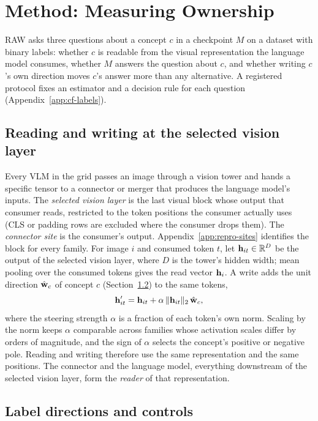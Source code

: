 \section{Method: Measuring Ownership}
\label{sec:framework}

RAW asks three questions about a concept $c$ in a checkpoint $M$ on a dataset with binary labels: whether $c$ is readable from the visual representation the language model consumes, whether $M$ answers the question about $c$, and whether writing $c$'s own direction moves $c$'s answer more than any alternative. A registered protocol fixes an estimator and a decision rule for each question (Appendix~\ref{app:cf-labels}).

\subsection{Reading and writing at the selected vision layer}
\label{sec:site}

Every VLM in the grid passes an image through a vision tower and hands a specific tensor to a connector or merger that produces the language model's inputs. The \emph{selected vision layer} is the last visual block whose output that consumer reads, restricted to the token positions the consumer actually uses (CLS or padding rows are excluded where the consumer drops them). The \emph{connector site} is the consumer's output. Appendix~\ref{app:repro-sites} identifies the block for every family. For image $i$ and consumed token $t$, let $\mathbf{h}_{it}\in\mathbb{R}^D$ be the output of the selected vision layer, where $D$ is the tower's hidden width; mean pooling over the consumed tokens gives the read vector $\mathbf{h}_i$. A write adds the unit direction $\hat{\mathbf{w}}_c$ of concept $c$ (Section~\ref{sec:directions}) to the same tokens,
\begin{equation}
\mathbf{h}'_{it}=\mathbf{h}_{it}+\alpha\,\lVert\mathbf{h}_{it}\rVert_2\,\hat{\mathbf{w}}_c,
\label{eq:intervention}
\end{equation}
where the steering strength $\alpha$ is a fraction of each token's own norm. Scaling by the norm keeps $\alpha$ comparable across families whose activation scales differ by orders of magnitude, and the sign of $\alpha$ selects the concept's positive or negative pole. Reading and writing therefore use the same representation and the same positions. The connector and the language model, everything downstream of the selected vision layer, form the \emph{reader} of that representation.

\subsection{Label directions and controls}
\label{sec:directions}

